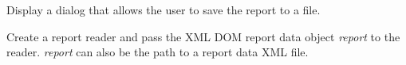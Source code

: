 \documentclass[letterpaper,10pt,english]{sphinxmanual}
\begin{document}
\begin{fulllineitems}
\begin{fulllineitems}
\end{fulllineitems}


\begin{fulllineitems}
\label{setlyze/gui:setlyze.gui.DisplayReport.on_save}
Display a dialog that allows the user to save the report to
a file.

\end{fulllineitems}


\begin{fulllineitems}
\label{setlyze/gui:setlyze.gui.DisplayReport.set_report_reader}
Create a report reader and pass the XML DOM report data
object \emph{report} to the reader. \emph{report} can also be the path to
a report data XML file.

\end{fulllineitems}


\end{fulllineitems}

\end{document}
